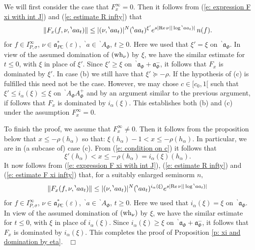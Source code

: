 \documentclass[12pt,a4paper]{article}
\def\qed{~\hfill\hbox{$\Box$}\medbreak}
\def\msy#1{{\mathbb #1}}
\def\C{{\msy C}}
\def\ga{\alpha}
\def\ge{\varepsilon}
\def\gs{\sigma}
\def\got#1{\mathfrak #1}
\def\fa{{\got a}}
\def\Re{{\rm Re}\,}
\def\iC{{\scriptscriptstyle \C}}
\numberwithin{Thm}{section}
\numberwithin{equation}{section}
\def\faPdc{{\fa_{P\iC}^*}}
\numberwithin{equation}{section}
\def\bp{\!{\,}^\backprime}
\def\faPdc{\fa_{P\iC}^*}
\def\IPgs{I_{P,\gs}^\infty}
\def\wh{{\rm wh}}
\def\xx{x}
\def\xxi{\xi}
\begin{document}
We will first consider the case that $F^\infty_\xx= 0.$ 
Then it follows from 
(\ref{e: expression F xi with int J}) and 
(\ref{e: estimate R infty}) that 
 $$ 
\|F_\xx(f, \nu, \bp aa_t)\| \leq |(\nu,\bp aa_t)|^N (\bp aa_t)^{\xxi'} e^{s|\Re \nu||\log \bp aa_t)|}\, n(f).
$$ 
for $f \in \IPgs$, $\nu \in \faPdc(\ge)$, $\bp a \in \bp A_\Phi$, $t \geq 0.$ 
Here we used that $\xxi'  = \xxi$ on $\bp \fa_\Phi.$ 
In view of the assumed domination of $(\wh_\nu)$ by $\xxi$, we have the similar estimate
for $t \leq 0$, with $\xxi$ in place of $\xxi'.$ Since $\xxi' \geq \xxi$ on $\bp \fa_\Phi + \fa_\Phi^-$, it follows that $F_\xx$ is dominated by $\xxi'$. In case (b) we still have that  $\xxi' \succeq -\rho.$ 
If the hypothesis of (c) is fulfilled this need not be the case. However, we may chose $c\in [c_0, 1[$ 
such that $\xxi' \leq i_\ga(\xxi) \leq \xxi$ on $\bp A_\Phi A_\Phi^+$ and by an argument similar to 
the previous argument, if follows that $F_\xx$ is dominated
by $i_\ga(\xxi).$ This establishes both (b) and (c) under the assumption $F^\infty_\xx = 0.$

To finish the proof, we assume that $F_\xx^\infty \neq 0.$ Then it follows from the proposition 
below that $\xx \leq -\rho(h_\ga)$ 
so that: $\xxi(h_\ga) - 1 < \xx \leq -\rho(h_\ga).$ In particular, we are in (a subcase of) case (c). 
From (\ref{e: condition on c})
it follows that 
$$
\xxi'(h_\ga) < \xx  \leq  - \rho(h_\ga) = i_\ga(\xxi)(h_\ga). 
$$ 
It now follows from 
(\ref{e: expression F xi with int J}), (\ref{e: estimate R infty}) and (\ref{e: estimate F xi infty})
that, for a suitably enlarged seminorm $n,$ 
$$ 
\|F_\xx(f, \nu, \bp aa_t)\| \leq |(\nu,\bp aa_t)|^N (\bp aa_t)^{i_\ga(\xxi)} e^{s|\Re \nu||\log \bp aa_t)|}
$$ 
for $f \in \IPgs$, $\nu \in \faPdc(\ge)$, $\bp a \in \bp A_\Phi$, $t \geq 0.$ 
Here we used that $i_\ga(\xxi) = \xxi$ on $\bp \fa_\Phi.$ 
In view of the assumed domination of $(\wh_\nu)$ by $\xxi$, we have the similar estimate
for $t \leq 0$, with $\xxi$ in place of $i_\ga(\xxi).$ Since $i_\ga(\xxi) \geq \xxi$ 
on $\bp \fa_\Phi + \fa_\Phi^-$, it follows that $F_\xx$ is dominated by $i_\ga(\xxi).$ 
This completes the proof of Proposition \ref{p: xi and domination by eta}.
\qed
\end{document}
